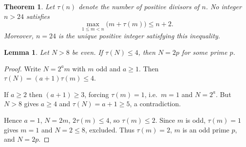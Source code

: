 \documentclass[11pt]{article}
\newtheorem{theorem}{Theorem}
\newtheorem{lemma}{Lemma}
\begin{document}
\begin{theorem}
Let $\tau(n)$ denote the number of positive divisors of $n$.  No integer $n > 24$
satisfies
\[
  \max_{1 \le m < n}\bigl(m + \tau(m)\bigr) \le n + 2.
\]
Moreover, $n = 24$ is the unique positive integer satisfying this inequality.
\end{theorem}

\begin{lemma}
Let $N > 8$ be even.  If $\tau(N) \le 4$, then $N = 2p$ for some prime $p$.
\end{lemma}

\begin{proof}
Write $N = 2^a m$ with $m$ odd and $a \ge 1$.  Then $\tau(N) = (a+1)\tau(m) \le 4$.

If $a \ge 2$ then $(a+1) \ge 3$, forcing $\tau(m) = 1$, i.e.\ $m = 1$ and
$N = 2^a$.  But $N > 8$ gives $a \ge 4$ and $\tau(N) = a+1 \ge 5$, a
contradiction.

Hence $a = 1$, $N = 2m$, $2\tau(m) \le 4$, so $\tau(m) \le 2$.  Since $m$ is
odd, $\tau(m) = 1$ gives $m = 1$ and $N = 2 \le 8$, excluded.  Thus $\tau(m) = 2$,
$m$ is an odd prime $p$, and $N = 2p$.
\end{proof}
\end{document}

